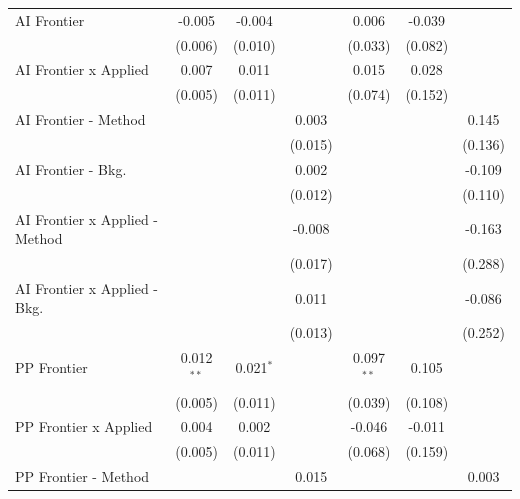 \begin{tabular}{lcccccc}
   AI Frontier                    & -0.005        & -0.004        &               & 0.006         & -0.039  &   \\   
                                  & (0.006)       & (0.010)       &               & (0.033)       & (0.082) &   \\   
   AI Frontier x Applied          & 0.007         & 0.011         &               & 0.015         & 0.028   &   \\   
                                  & (0.005)       & (0.011)       &               & (0.074)       & (0.152) &   \\   
   AI Frontier - Method           &               &               & 0.003         &               &         & 0.145\\   
                                  &               &               & (0.015)       &               &         & (0.136)\\   
   AI Frontier - Bkg.             &               &               & 0.002         &               &         & -0.109\\   
                                  &               &               & (0.012)       &               &         & (0.110)\\   
   AI Frontier x Applied - Method &               &               & -0.008        &               &         & -0.163\\   
                                  &               &               & (0.017)       &               &         & (0.288)\\   
   AI Frontier x Applied - Bkg.   &               &               & 0.011         &               &         & -0.086\\   
                                  &               &               & (0.013)       &               &         & (0.252)\\   
   PP Frontier                    & 0.012$^{**}$  & 0.021$^{*}$   &               & 0.097$^{**}$  & 0.105   &   \\   
                                  & (0.005)       & (0.011)       &               & (0.039)       & (0.108) &   \\   
   PP Frontier x Applied          & 0.004         & 0.002         &               & -0.046        & -0.011  &   \\   
                                  & (0.005)       & (0.011)       &               & (0.068)       & (0.159) &   \\   
   PP Frontier - Method           &               &               & 0.015         &               &         & 0.003\\   

\end{tabular}
